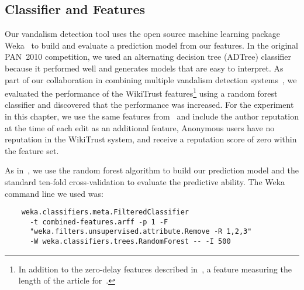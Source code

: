 \newcommand{\sign}{{{\textrm{sign}}}}

\subsection{Classifier and Features}

Our vandalism detection tool uses the open source machine learning
package Weka~\cite{Weka09} to build and evaluate a prediction model from
our features.
In the original PAN~2010 competition, we used an alternating decision
tree (ADTree) classifier~\cite{Adler2010b} because it performed well and
generates models that are easy to interpret.
As part of our collaboration in combining multiple vandalism detection
systems~\cite{Adler2011a}, we evaluated the performance of the
WikiTrust features\footnote{In addition to the zero-delay features
described in~\cite{Adler2010b}, a feature measuring the length
of the article for~\cite{Adler2011a}.}
using a random forest classifier and discovered that the performance was
increased.
For the experiment in this chapter, we use the same features
from~\cite{Adler2010b} and include the author reputation at the time of
each edit as an additional feature,
Anonymous users have no reputation in the WikiTrust system, and receive
a reputation score of zero within the feature set.

As in~\cite{Adler2011a}, we use the random forest algorithm to build our
prediction model and the standard ten-fold cross-validation to evaluate
the predictive ability.
The Weka command line we used was:
%
{\small
\begin{verbatim}
    weka.classifiers.meta.FilteredClassifier
      -t combined-features.arff -p 1 -F
      "weka.filters.unsupervised.attribute.Remove -R 1,2,3"
      -W weka.classifiers.trees.RandomForest -- -I 500
\end{verbatim}
}

